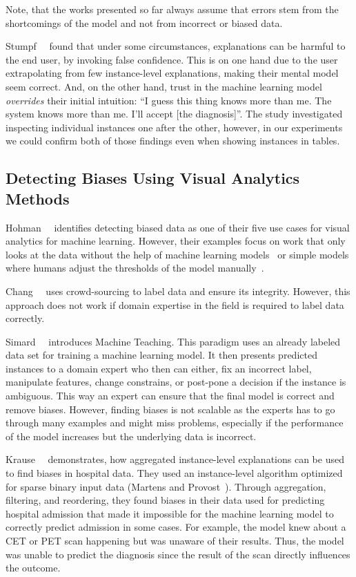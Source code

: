 Note, that the works presented so far always assume that errors stem from the shortcomings of the model and not from incorrect or biased data.

Stumpf~\etal~\cite{harmful} found that under some circumstances, explanations can be harmful to the end user, by invoking false confidence.
This is on one hand due to the user extrapolating from few instance-level explanations, making their mental model seem correct.
And, on the other hand, trust in the machine learning model \emph{overrides} their initial intuition: ``I guess this thing knows more than me. The system knows more than me. I'll accept [the diagnosis]''.
The study investigated inspecting individual instances one after the other, however,
in our experiments we could confirm both of those findings even when showing instances in tables.

\subsection{Detecting Biases Using Visual Analytics Methods}
Hohman~\etal~\cite{2018arXiv180106889H} identifies detecting biased data as one of their five use cases for visual analytics for machine learning.
However, their examples focus on work that only looks at the data without the help of machine learning models~\cite{facets} or simple models where humans adjust the thresholds of the model manually~\cite{wattenberg}.

Chang~\etal~\cite{revolt-collaborative-crowdsourcing-labeling-machine-learning-datasets} uses crowd-sourcing to label data and ensure its integrity.
However, this approach does not work if domain expertise in the field is required to label data correctly.

Simard~\etal~\cite{DBLP:journals/corr/SimardACPGMRSVW17} introduces Machine Teaching.
This paradigm uses an already labeled data set for training a machine learning model.
It then presents predicted instances to a domain expert who then can either, fix an incorrect label, manipulate features, change constrains, or post-pone a decision if the instance is ambiguous.
This way an expert can ensure that the final model is correct and remove biases.
However, finding biases is not scalable as the experts has to go through many examples and might miss problems, especially if the performance of the model increases but the underlying data is incorrect.

Krause~\etal~\cite{explainer} demonstrates, how aggregated instance-level explanations can be used to find biases in hospital data.
They used an instance-level algorithm optimized for sparse binary input data (Martens and Provost~\cite{Martens:2014:EDD:2600518.2600523}).
Through aggregation, filtering, and reordering, they found biases in their data used for predicting hospital admission that made it impossible for the machine learning model to correctly predict admission in some cases.
For example, the model knew about a CET or PET scan happening but was unaware of their results.
Thus, the model was unable to predict the diagnosis since the result of the scan directly influences the outcome.



